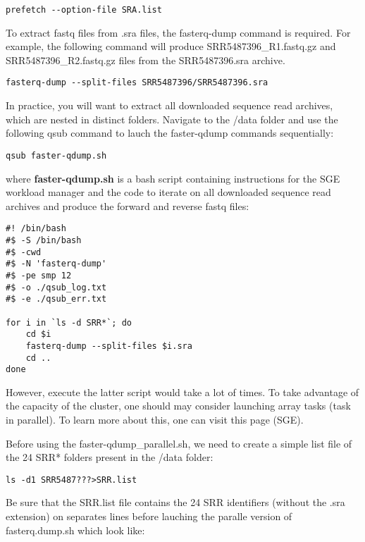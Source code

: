 \begin{verbatim}
prefetch --option-file SRA.list
\end{verbatim}

To extract fastq files from .sra files, the fasterq-dump command is required. For example, the following command will produce SRR5487396\_R1.fastq.gz and SRR5487396\_R2.fastq.gz files from the SRR5487396.sra archive.

\begin{verbatim}
fasterq-dump --split-files SRR5487396/SRR5487396.sra
\end{verbatim}

In practice, you will want to extract all downloaded sequence read archives, which are nested in distinct folders. Navigate to the /data folder and use the following qsub command to lauch the faster-qdump commands sequentially:

\begin{verbatim}
qsub faster-qdump.sh
\end{verbatim}

where \textbf{faster-qdump.sh} is a bash script containing instructions for the SGE workload manager and the code to iterate on all downloaded sequence read archives and produce the forward and reverse fastq files:

\begin{verbatim}
#! /bin/bash
#$ -S /bin/bash
#$ -cwd
#$ -N 'fasterq-dump'
#$ -pe smp 12
#$ -o ./qsub_log.txt
#$ -e ./qsub_err.txt
	
for i in `ls -d SRR*`; do
	cd $i
	fasterq-dump --split-files $i.sra
	cd ..
done
\end{verbatim}



However, execute the latter script would take a lot of times. To take advantage of the capacity of the cluster, one should may consider launching array tasks (task in parallel). To learn more about this, one can visit this page (SGE).

Before using the faster-qdump\_parallel.sh, we need to create a simple list file of the 24 SRR* folders present in the /data folder:

\begin{verbatim}
ls -d1 SRR5487???>SRR.list
\end{verbatim}

Be sure that the SRR.list file contains the 24 SRR identifiers (without the .sra extension) on separates lines before lauching the paralle version of fasterq.dump.sh which look like:

